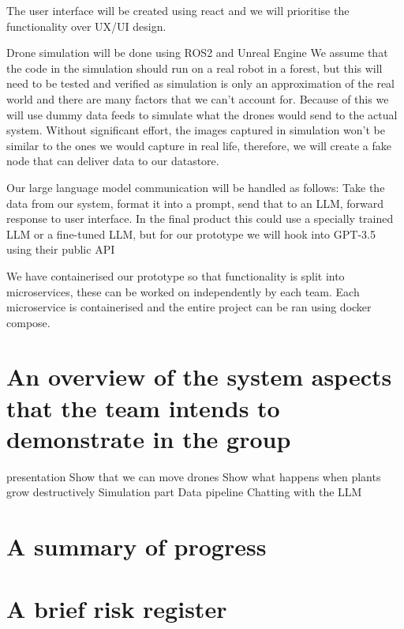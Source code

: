 \documentclass{article}
\begin{document}
The user interface will be created using react and we will prioritise the functionality over UX/UI design. 

Drone simulation will be done using ROS2 and Unreal Engine %
We assume that the code in the simulation should run on a real robot in a forest, but this will need to be tested and verified as simulation is only an approximation of the real world and there are many factors that we can't account for.
Because of this we will use dummy data feeds to simulate what the drones would send to the actual system.
Without significant effort, the images captured in simulation won't be similar to the ones we would capture in real life, therefore, we will create a fake node that can deliver data to our datastore.

Our large language model communication will be handled as follows: Take the data from our system, format it into a prompt, send that to an LLM, forward response to user interface.
In the final product this could use a specially trained LLM or a fine-tuned LLM, but for our prototype we will hook into GPT-3.5 using their public API %

We have containerised our prototype so that functionality is split into microservices, these can be worked on independently by each team.
Each microservice is containerised and the entire project can be ran using docker compose.


\section{An overview of the system aspects that the team intends to demonstrate in the group}
presentation
    Show that we can move drones
    Show what happens when plants grow destructively
        Simulation part
        Data pipeline 
    Chatting with the LLM


\section{A summary of progress}


\section{A brief risk register}
\end{document}
